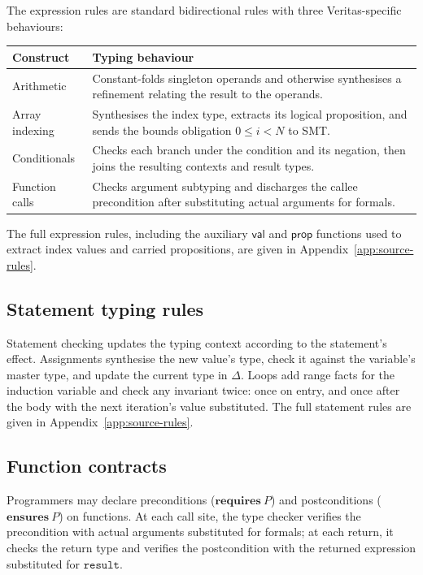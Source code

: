 The expression rules are standard bidirectional rules with three Veritas-specific behaviours:

\begin{center}
\small
\begin{tabularx}{0.96\textwidth}{>{\raggedright\arraybackslash}p{} >{\raggedright\arraybackslash}X}
\toprule
\textbf{Construct} & \textbf{Typing behaviour} \\
\midrule
Arithmetic & Constant-folds singleton operands and otherwise synthesises a refinement relating the result to the operands. \\
Array indexing & Synthesises the index type, extracts its logical proposition, and sends the bounds obligation $0 \le i < N$ to SMT. \\
Conditionals & Checks each branch under the condition and its negation, then joins the resulting contexts and result types. \\
Function calls & Checks argument subtyping and discharges the callee precondition after substituting actual arguments for formals. \\
\bottomrule
\end{tabularx}
\end{center}

The full expression rules, including the auxiliary $\textsf{val}$ and $\textsf{prop}$ functions used to extract index values and carried propositions, are given in Appendix~\ref{app:source-rules}.

\subsection{Statement typing rules}\label{sec:stmt-typing-rules}

Statement checking updates the typing context according to the statement's effect. Assignments synthesise the new value's type, check it against the variable's master type, and update the current type in $\Delta$. Loops add range facts for the induction variable and check any invariant twice: once on entry, and once after the body with the next iteration's value substituted. The full statement rules are given in Appendix~\ref{app:source-rules}.

\subsection{Function contracts}

Programmers may declare preconditions ($\mathbf{requires}\ P$) and postconditions ($\mathbf{ensures}\ P$) on functions. At each call site, the type checker verifies the precondition with actual arguments substituted for formals; at each return, it checks the return type and verifies the postcondition with the returned expression substituted for $\mathtt{result}$.

